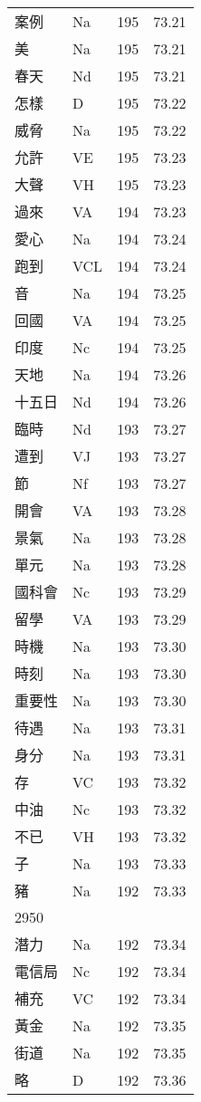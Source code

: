 \documentclass[twocolumn]{book}
\begin{document}
\begin{supertabular}{llrr}
案例 & Na & 195 &  73.21\\
美 & Na & 195 &  73.21\\
春天 & Nd & 195 &  73.21\\
怎樣 & D & 195 &  73.22\\
威脅 & Na & 195 &  73.22\\
允許 & VE & 195 &  73.23\\
大聲 & VH & 195 &  73.23\\
過來 & VA & 194 &  73.23\\
愛心 & Na & 194 &  73.24\\
跑到 & VCL & 194 &  73.24\\
音 & Na & 194 &  73.25\\
回國 & VA & 194 &  73.25\\
印度 & Nc & 194 &  73.25\\
天地 & Na & 194 &  73.26\\
十五日 & Nd & 194 &  73.26\\
臨時 & Nd & 193 &  73.27\\
遭到 & VJ & 193 &  73.27\\
節 & Nf & 193 &  73.27\\
開會 & VA & 193 &  73.28\\
景氣 & Na & 193 &  73.28\\
單元 & Na & 193 &  73.28\\
國科會 & Nc & 193 &  73.29\\
留學 & VA & 193 &  73.29\\
時機 & Na & 193 &  73.30\\
時刻 & Na & 193 &  73.30\\
重要性 & Na & 193 &  73.30\\
待遇 & Na & 193 &  73.31\\
身分 & Na & 193 &  73.31\\
存 & VC & 193 &  73.32\\
中油 & Nc & 193 &  73.32\\
不已 & VH & 193 &  73.32\\
子 & Na & 193 &  73.33\\
豬 & Na & 192 &  73.33\\
2950\\
潛力 & Na & 192 &  73.34\\
電信局 & Nc & 192 &  73.34\\
補充 & VC & 192 &  73.34\\
黃金 & Na & 192 &  73.35\\
街道 & Na & 192 &  73.35\\
略 & D & 192 &  73.36\\

\end{supertabular}
\end{document}
